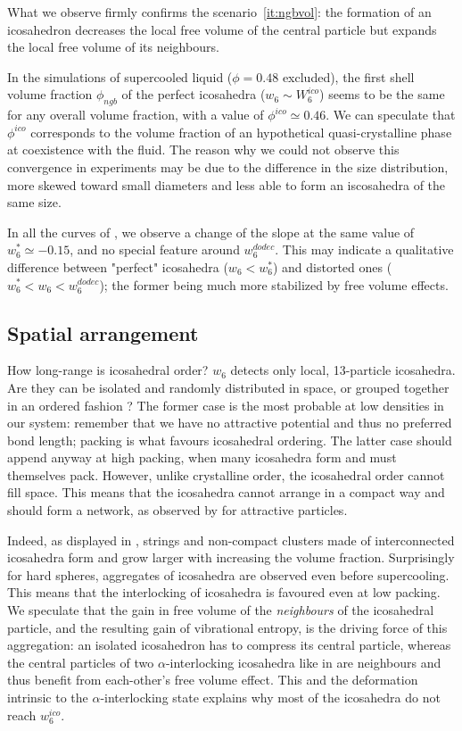 What we observe firmly confirms the scenario~\ref{it:ngbvol}: the formation of an icosahedron decreases the local free volume of the central particle but expands the local free volume of its neighbours.

In the simulations of supercooled liquid ($\phi=0.48$ excluded), the first shell volume fraction $\phi_{ngb}$ of the perfect icosahedra ($w_6 \sim W_6^{ico}$) seems to be the same for any overall volume fraction, with a value of $\phi^{ico} \simeq 0.46$. We can speculate that $\phi^{ico}$ corresponds to the volume fraction of an hypothetical quasi-crystalline phase at coexistence with the fluid. The reason why we could not observe this convergence in experiments may be due to the difference in the size distribution, more skewed toward small diameters and less able to form an iscosahedra of the same size.

In all the curves of , we observe a change of the slope at the same value of $w_6^* \simeq -0.15$, and no special feature around $w_6^{dodec}$. This may indicate a qualitative difference between "perfect" icosahedra ($w_6<w_6^*$) and distorted ones ($w_6^*<w_6<w_6^{dodec}$); the former being much more stabilized by free volume effects.

\subsection{Spatial arrangement}

How long-range is icosahedral order? $w_6$ detects only local, 13-particle icosahedra. Are they can be isolated and randomly distributed in space, or grouped together in an ordered fashion ? The former case is the most probable at low densities in our system: remember that we have no attractive potential and thus no preferred bond length; packing is what favours icosahedral ordering. The latter case should append anyway at high packing, when many icosahedra form and must themselves pack. However, unlike crystalline order, the icosahedral order cannot fill space. This means that the icosahedra cannot arrange in a compact way and should form a network, as observed by \citet{Tomida1995} for attractive particles.

Indeed, as displayed in , strings and non-compact clusters made of interconnected icosahedra form and grow larger with increasing the volume fraction. Surprisingly for hard spheres, aggregates of icosahedra are observed even before supercooling. This means that the interlocking of icosahedra is favoured even at low packing. We speculate that the gain in free volume of the \emph{neighbours} of the icosahedral particle, and the resulting gain of vibrational entropy, is the driving force of this aggregation: an isolated icosahedron has to compress its central particle, whereas the central particles of two $\alpha$-interlocking icosahedra like in  are neighbours and thus benefit from each-other's free volume effect. This and the deformation intrinsic to the $\alpha$-interlocking state explains why most of the icosahedra do not reach $w_6^{ico}$.

